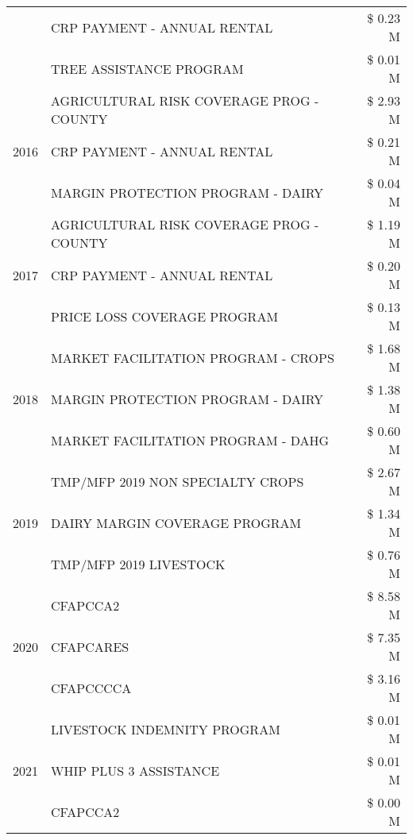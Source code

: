 \begin{tabular}{llr}
 & CRP PAYMENT - ANNUAL RENTAL & \$ 0.23 M \\
 & TREE ASSISTANCE PROGRAM & \$ 0.01 M \\
\cline{1-3}
\multirow[t]{3}{*}{2016} & AGRICULTURAL RISK COVERAGE PROG - COUNTY & \$ 2.93 M \\
 & CRP PAYMENT - ANNUAL RENTAL & \$ 0.21 M \\
 & MARGIN PROTECTION PROGRAM - DAIRY & \$ 0.04 M \\
\cline{1-3}
\multirow[t]{3}{*}{2017} & AGRICULTURAL RISK COVERAGE PROG - COUNTY & \$ 1.19 M \\
 & CRP PAYMENT - ANNUAL RENTAL & \$ 0.20 M \\
 & PRICE LOSS COVERAGE PROGRAM & \$ 0.13 M \\
\cline{1-3}
\multirow[t]{3}{*}{2018} & MARKET FACILITATION PROGRAM - CROPS & \$ 1.68 M \\
 & MARGIN PROTECTION PROGRAM - DAIRY & \$ 1.38 M \\
 & MARKET FACILITATION PROGRAM - DAHG & \$ 0.60 M \\
\cline{1-3}
\multirow[t]{3}{*}{2019} & TMP/MFP 2019 NON SPECIALTY CROPS & \$ 2.67 M \\
 & DAIRY MARGIN COVERAGE PROGRAM & \$ 1.34 M \\
 & TMP/MFP 2019 LIVESTOCK & \$ 0.76 M \\
\cline{1-3}
\multirow[t]{3}{*}{2020} & CFAPCCA2 & \$ 8.58 M \\
 & CFAPCARES & \$ 7.35 M \\
 & CFAPCCCCA & \$ 3.16 M \\
\cline{1-3}
\multirow[t]{3}{*}{2021} & LIVESTOCK INDEMNITY PROGRAM & \$ 0.01 M \\
 & WHIP PLUS 3 ASSISTANCE & \$ 0.01 M \\
 & CFAPCCA2 & \$ 0.00 M \\
\cline{1-3}
\bottomrule
\end{tabular}
